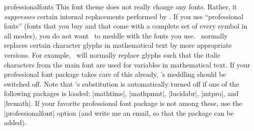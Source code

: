 \begin{fontthemeexample*}{professionalfonts}
  This font theme does not really change any fonts. Rather, it
  \emph{suppresses} certain internal replacements performed by
  \beamer. If you use ``professional fonts'' (fonts that you buy and
  that come with a complete set of every symbol in all modes), you do
  not want \beamer\ to meddle with the fonts you use.  \beamer\
  normally replaces certain character glyphs in mathematical text by
  more appropriate versions. For example, \beamer\ will normally
  replace glyphs such that the italic characters from the main font
  are used for variables in mathematical text. If your professional
  font package takes care of this already, \beamer's meddling should
  be switched off. Note that \beamer's substitution is automatically
  turned off if one of the following packages is loaded: |mathtime|,
  |mathpmnt|, |lucidabr|, |mtpro|, and |hvmath|. If your favorite
  professional font package is not among these, use the
  |professionalfont| option (and write me an email, so that the
  package can be added). 
\end{fontthemeexample*}



